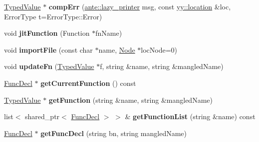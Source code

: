 \begin{DoxyCompactItemize}
\item 
\mbox{\label{structante_1_1Compiler_a5ffb3b5970aa4abc4d4512e958796a52}} 
\hyperlink{structTypedValue}{Typed\+Value} $\ast$ {\bfseries comp\+Err} (\hyperlink{structante_1_1lazy__printer}{ante\+::lazy\+\_\+printer} msg, const \hyperlink{classyy_1_1location}{yy\+::location} \&loc, Error\+Type t=Error\+Type\+::\+Error)
\item 
\mbox{\label{structante_1_1Compiler_a0712cc6dbd65814f64ed1141d59ab80d}} 
void {\bfseries jit\+Function} (Function $\ast$fn\+Name)
\item 
\mbox{\label{structante_1_1Compiler_aeb22d4fb05bfd59a8e62f12bbc4ac303}} 
void {\bfseries import\+File} (const char $\ast$name, \hyperlink{structNode}{Node} $\ast$loc\+Node=0)
\item 
\mbox{\label{structante_1_1Compiler_ab79a6faf5ca35d988546c7cfb0da189c}} 
void {\bfseries update\+Fn} (\hyperlink{structTypedValue}{Typed\+Value} $\ast$f, string \&name, string \&mangled\+Name)
\item 
\mbox{\label{structante_1_1Compiler_aadf5d45aa729c1998a8c6d0c363d37c6}} 
\hyperlink{structFuncDecl}{Func\+Decl} $\ast$ {\bfseries get\+Current\+Function} () const
\item 
\mbox{\label{structante_1_1Compiler_aa7126098076855a4d28745e01e836643}} 
\hyperlink{structTypedValue}{Typed\+Value} $\ast$ {\bfseries get\+Function} (string \&name, string \&mangled\+Name)
\item 
\mbox{\label{structante_1_1Compiler_a87da0a94baee4c3c47b62127d405f0ff}} 
list$<$ shared\+\_\+ptr$<$ \hyperlink{structFuncDecl}{Func\+Decl} $>$ $>$ \& {\bfseries get\+Function\+List} (string \&name) const
\item 
\mbox{\label{structante_1_1Compiler_afd9f784ef4a885779619d34bc600b4d4}} 
\hyperlink{structFuncDecl}{Func\+Decl} $\ast$ {\bfseries get\+Func\+Decl} (string bn, string mangled\+Name)
\item 
\mbox{\label{structante_1_1Compiler_a23c839566efaab64eb5fda7ec210effb}} 

\end{DoxyCompactItemize}
